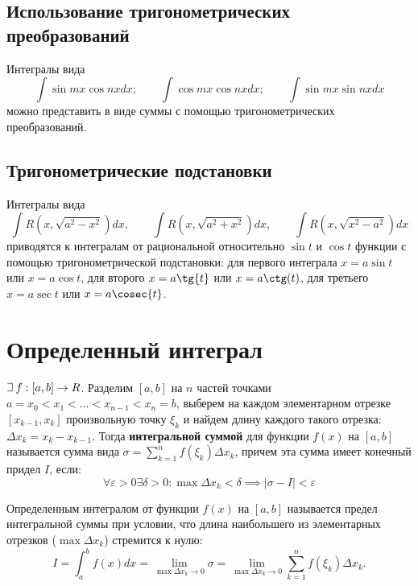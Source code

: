 \documentclass[a4paper,12pt,oneside]{extbook}
\def\lets{%
    \mathord{\setbox0=\hbox{$\exists$}%
        \hbox{\kern 0.125\wd0%
            \vbox to \ht0{%
                \hrule width 0.75\wd0%
                \vfill%
                \hrule width 0.75\wd0}%
            \vrule height \ht0%
            \kern 0.125\wd0}%
    }%
    \hspace{2pt}
}
\theoremstyle{numbered}
\theoremstyle{unnumbered}
\theoremstyle{named}
\theoremstyle{unnumbered}
\theoremstyle{named}
\theoremstyle{named}
\theoremstyle{named}
\begin{document}
\subsection{Использование тригонометрических преобразований}%
\label{sub:Использование тригонометрических преобразований}

Интегралы вида
\begin{equation}
    \int \sin{mx}\cos{nx}dx;
    \qquad
    \int \cos{mx}\cos{nx}dx;
    \qquad
    \int \sin{mx}\sin{nx}dx
\end{equation}
можно представить в виде суммы с помощью тригонометрических преобразований.

\subsection{Тригонометрические подстановки}%
\label{sub:Тригонометрические подстановки}

Интегралы вида
\begin{equation}
    \int R(x, \sqrt{a^2 - x^2})dx, \qquad \int R(x, \sqrt{a^2 + x^2})dx, \qquad \int R(x, \sqrt{x^2 - a^2})dx
\end{equation}
приводятся к интегралам от рациональной относительно \(\sin{t}\) и \(\cos{t}\) функции с помощью тригонометрической подстановки: для первого интеграла \(x = a\sin{t}\) или \(x = a\cos{t}\), для второго \(x = a\tg{t}\) или \(x = a\ctg(t)\), для третьего \(x = a\sec{t}\) или \(x = a\cosec{t}\).



\section{Определенный интеграл}%
\label{sec:Определенный интеграл}

\(\lets f: [a, b] \to R\). Разделим \([a, b]\) на \(n\) частей точками \(a = x_0 < x_1 < \ldots < x_{n - 1} < x_n = b\), выберем на каждом элементарном отрезке \([x_{k - 1}, x_k]\) произвольную точку \(\xi_k\) и найдем длину каждого такого отрезка: \(\Delta x_k = x_k - x_{k - 1}\). Тогда \textbf{интегральной суммой} для функции \(f(x)\) на \([a, b]\) называется сумма вида \(\sigma = \displaystyle \sum_{k=1}^n f(\xi_k) \Delta x_k\), причем эта сумма имеет конечный придел \(I\), если:
\[
    \forall \varepsilon > 0 \exists \delta > 0: \max{\Delta x_k} < \delta \implies |\sigma - I| < \varepsilon
\]

Определенным интегралом от функции \(f(x)\) на \([a, b]\) называется предел интегральной суммы при условии, что длина наибольшего из элементарных отрезков (\(\max{\Delta x_k}\)) стремится к нулю:
\[
    I = \int_a^b f(x) dx = \lim_{\max{\Delta x_k} \to 0}{\sigma} = \lim_{\max{\Delta x_k} \to 0}{\displaystyle \sum_{k=1}^n f(\xi_k) \Delta x_k}.
\]
\end{document}
